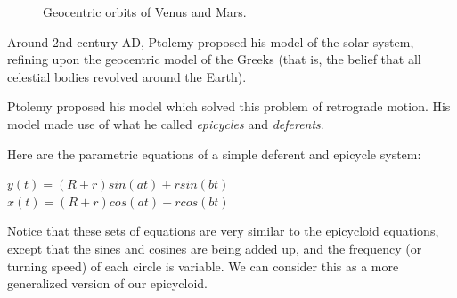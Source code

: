 \begin{figure}[H]%
    \centering
    \qquad
    \caption{Geocentric orbits of Venus and Mars.}%
    \label{fig:example}%
\end{figure}

Around 2nd century AD, Ptolemy proposed his model of the solar system, refining upon the geocentric model of the Greeks (that is, the belief that all celestial bodies revolved around the Earth). 



Ptolemy proposed his model which solved this problem of retrograde motion. His model made use of what he called \textit{epicycles} and \textit{deferents}. 

Here are the parametric equations of a simple deferent and epicycle system:
\begin{centering}
$y(t) = (R+r)sin(at) + rsin(bt)$ \\ 
$x(t) = (R+r)cos(at) + rcos(bt)$ \\
\end{centering}

Notice that these sets of equations are very similar to the epicycloid equations, except that the sines and cosines are being added up, and the frequency (or turning speed) of each circle is variable. We can consider this as a more generalized version of our epicycloid. 



